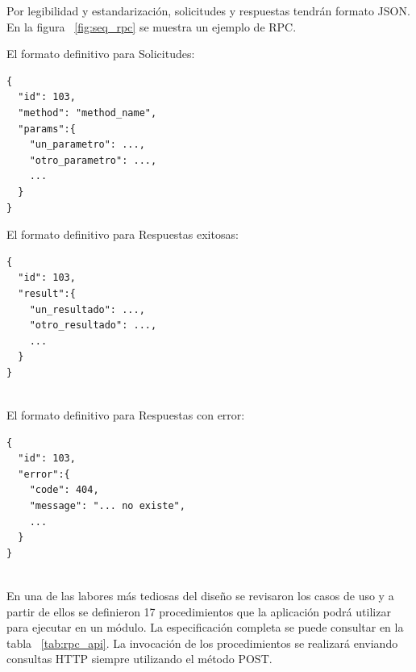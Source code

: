 Por legibilidad y estandarización, solicitudes y respuestas tendrán formato JSON. En la figura ~\ref{fig:seq_rpc} se muestra un ejemplo de RPC.

\begin{multicols}{3} %
	
	El formato definitivo para Solicitudes:
	\begin{lstlisting}
{
  "id": 103,
  "method": "method_name",
  "params":{
    "un_parametro": ...,
    "otro_parametro": ...,
    ...
  }
}
	\end{lstlisting}
	
	\columnbreak %
	
	El formato definitivo para Respuestas exitosas:
	\begin{lstlisting}
{
  "id": 103,
  "result":{
    "un_resultado": ...,
    "otro_resultado": ...,
    ...
  }
}
	
	\end{lstlisting}
	
	\columnbreak %
	
	El formato definitivo para Respuestas con error:
	\begin{lstlisting}
{
  "id": 103,
  "error":{
    "code": 404,
    "message": "... no existe",
    ...
  }
}
	
	\end{lstlisting}
	
\end{multicols}
En una de las labores más tediosas del diseño se revisaron los casos de uso y a partir de ellos se definieron 17 procedimientos que la aplicación podrá utilizar para ejecutar en un módulo. La especificación completa se puede consultar en la tabla ~\ref{tab:rpc_api}.
La invocación de los procedimientos se realizará enviando consultas HTTP siempre utilizando el método POST.

